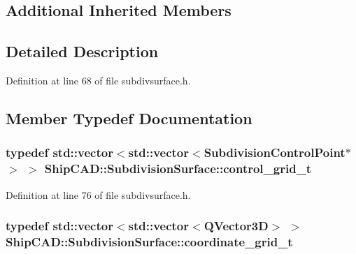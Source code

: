 \subsection*{Additional Inherited Members}


\subsection{Detailed Description}


Definition at line 68 of file subdivsurface.\-h.



\subsection{Member Typedef Documentation}
\hypertarget{classShipCAD_1_1SubdivisionSurface_ae53cacefe98ce33992a05f941f4ff4ee}{
\subsubsection[{control\-\_\-grid\-\_\-t}]{\setlength{\rightskip}{0pt plus 5cm}typedef std\-::vector$<$std\-::vector$<${\bf Subdivision\-Control\-Point}$\ast$$>$ $>$ {\bf Ship\-C\-A\-D\-::\-Subdivision\-Surface\-::control\-\_\-grid\-\_\-t}}}\label{classShipCAD_1_1SubdivisionSurface_ae53cacefe98ce33992a05f941f4ff4ee}


Definition at line 76 of file subdivsurface.\-h.

\hypertarget{classShipCAD_1_1SubdivisionSurface_a8ed657cb7d4cd34662bd2d3e949d3e3b}{
\subsubsection[{coordinate\-\_\-grid\-\_\-t}]{\setlength{\rightskip}{0pt plus 5cm}typedef std\-::vector$<$std\-::vector$<$Q\-Vector3\-D$>$ $>$ {\bf Ship\-C\-A\-D\-::\-Subdivision\-Surface\-::coordinate\-\_\-grid\-\_\-t}}}\label{classShipCAD_1_1SubdivisionSurface_a8ed657cb7d4cd34662bd2d3e949d3e3b}



